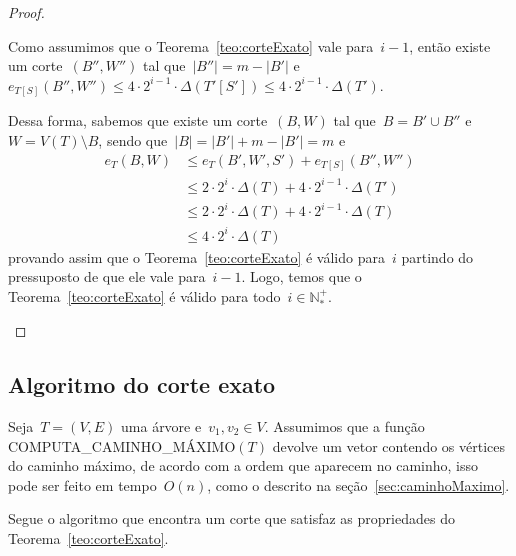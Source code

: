 \documentclass[a4paper,12pt]{article}
\begin{document}
\begin{proof}
\begin{itemize}
			Como assumimos que o Teorema~\ref{teo:corteExato} vale
			para~${i-1}$, então existe um corte~$(B'',W'')$
			tal que~${|B''|=m-|B'|}$ 
			e~${e_{T[S]}(B'',W'')\le 4\cdot 2^{i-1}\cdot
			\Delta(T'[S'])\le 4\cdot 2^{i-1}\cdot\Delta(T')}$.

			Dessa forma, sabemos que existe um corte~$(B,W)$ tal
			que~${B=B'\cup B''}$ e~${W=V(T)\setminus B}$, sendo 
			que~${|B|=|B'| + m-|B'| = m}$ e
			\begin{align}
				e_T(B,W)&\le e_T(B',W',S') + e_{T[S]}(B'',W'') 
				\nonumber\\
				&\le 2\cdot2^i\cdot\Delta(T) + 4\cdot 2^{i-1}\cdot
				\Delta(T')\nonumber\\
				&\le 2\cdot2^i\cdot\Delta(T) + 4\cdot 2^{i-1}\cdot
				\Delta(T)\nonumber\\
				&\le 4\cdot 2^{i}\cdot\Delta(T) \nonumber
			\end{align}
			provando assim que o Teorema~\ref{teo:corteExato} é
			válido para~$i$ partindo do pressuposto de que ele vale
			para~${i-1}$. Logo, temos que o 
			Teorema~\ref{teo:corteExato} é válido para 
			todo~${i\in \mathbb{N^+_*}}$.
			
		\end{itemize}
	\end{proof}

	\bigskip
	\bigskip
	\bigskip
	\bigskip
	\bigskip

	\subsection{Algoritmo do corte exato}

		Seja~${T=(V,E)}$ uma árvore e~${v_1,v_2\in V}$.
		Assumimos que a função COMPUTA\_CAMINHO\_MÁXIMO$(T)$ 
		devolve um vetor contendo os vértices do caminho 
		máximo, de acordo com a ordem que aparecem no caminho, 
		isso pode ser feito em tempo~$O(n)$, como o descrito na 
		seção~\ref{sec:caminhoMaximo}.


		Segue o algoritmo que encontra um corte que satisfaz as 
		propriedades do Teorema~\ref{teo:corteExato}.
		
\end{document}
